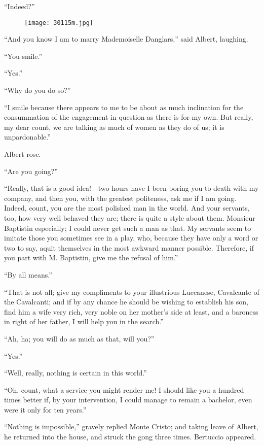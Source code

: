 “Indeed?”

\begin{figure}[ht]
\texttt{[image: 30115m.jpg]}
\end{figure}

“And you know I am to marry Mademoiselle Danglars,” said Albert,
laughing.

“You smile.”

“Yes.”

“Why do you do so?”

“I smile because there appears to me to be about as much inclination
for the consummation of the engagement in question as there is for my
own. But really, my dear count, we are talking as much of women as they
do of us; it is unpardonable.”

Albert rose.

“Are you going?”

“Really, that is a good idea!—two hours have I been boring you to death
with my company, and then you, with the greatest politeness, ask me if
I am going. Indeed, count, you are the most polished man in the world.
And your servants, too, how very well behaved they are; there is quite
a style about them. Monsieur Baptistin especially; I could never get
such a man as that. My servants seem to imitate those you sometimes see
in a play, who, because they have only a word or two to say, aquit
themselves in the most awkward manner possible. Therefore, if you part
with M. Baptistin, give me the refusal of him.”

“By all means.”

“That is not all; give my compliments to your illustrious Luccanese,
Cavalcante of the Cavalcanti; and if by any chance he should be wishing
to establish his son, find him a wife very rich, very noble on her
mother’s side at least, and a baroness in right of her father, I will
help you in the search.”

“Ah, ha; you will do as much as that, will you?”

“Yes.”

“Well, really, nothing is certain in this world.”

“Oh, count, what a service you might render me! I should like you a
hundred times better if, by your intervention, I could manage to remain
a bachelor, even were it only for ten years.”

“Nothing is impossible,” gravely replied Monte Cristo; and taking leave
of Albert, he returned into the house, and struck the gong three times.
Bertuccio appeared.


